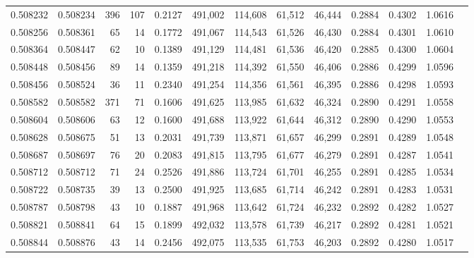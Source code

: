 \begin{tabular}{rrrrrrrrrrrrr}
0.508232 & 0.508234 &   396 &   107 &                                     0.2127 & 491,002 & 114,608 &  61,512 &  46,444 & 0.2884 & 0.4302 & 1.0616 \\
0.508256 & 0.508361 &    65 &    14 &                                     0.1772 & 491,067 & 114,543 &  61,526 &  46,430 & 0.2884 & 0.4301 & 1.0610 \\
0.508364 & 0.508447 &    62 &    10 &                                     0.1389 & 491,129 & 114,481 &  61,536 &  46,420 & 0.2885 & 0.4300 & 1.0604 \\
0.508448 & 0.508456 &    89 &    14 &                                     0.1359 & 491,218 & 114,392 &  61,550 &  46,406 & 0.2886 & 0.4299 & 1.0596 \\
0.508456 & 0.508524 &    36 &    11 &                                     0.2340 & 491,254 & 114,356 &  61,561 &  46,395 & 0.2886 & 0.4298 & 1.0593 \\
0.508582 & 0.508582 &   371 &    71 &                                     0.1606 & 491,625 & 113,985 &  61,632 &  46,324 & 0.2890 & 0.4291 & 1.0558 \\
0.508604 & 0.508606 &    63 &    12 &                                     0.1600 & 491,688 & 113,922 &  61,644 &  46,312 & 0.2890 & 0.4290 & 1.0553 \\
0.508628 & 0.508675 &    51 &    13 &                                     0.2031 & 491,739 & 113,871 &  61,657 &  46,299 & 0.2891 & 0.4289 & 1.0548 \\
0.508687 & 0.508697 &    76 &    20 &                                     0.2083 & 491,815 & 113,795 &  61,677 &  46,279 & 0.2891 & 0.4287 & 1.0541 \\
0.508712 & 0.508712 &    71 &    24 &                                     0.2526 & 491,886 & 113,724 &  61,701 &  46,255 & 0.2891 & 0.4285 & 1.0534 \\
0.508722 & 0.508735 &    39 &    13 &                                     0.2500 & 491,925 & 113,685 &  61,714 &  46,242 & 0.2891 & 0.4283 & 1.0531 \\
0.508787 & 0.508798 &    43 &    10 &                                     0.1887 & 491,968 & 113,642 &  61,724 &  46,232 & 0.2892 & 0.4282 & 1.0527 \\
0.508821 & 0.508841 &    64 &    15 &                                     0.1899 & 492,032 & 113,578 &  61,739 &  46,217 & 0.2892 & 0.4281 & 1.0521 \\
0.508844 & 0.508876 &    43 &    14 &                                     0.2456 & 492,075 & 113,535 &  61,753 &  46,203 & 0.2892 & 0.4280 & 1.0517 \\

\end{tabular}
